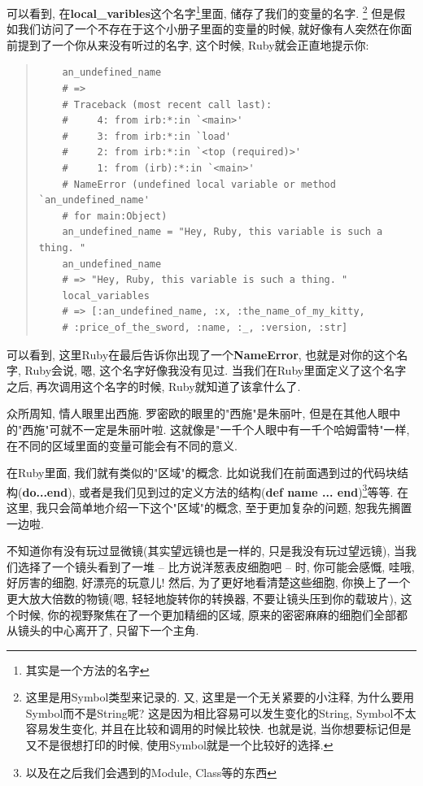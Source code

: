 可以看到, 在\textbf{local\_varibles}这个名字\footnote{其实是一个方法的名字}里面, 储存了我们的变量的名字. \footnote{这里是用Symbol类型来记录的. 又, 这里是一个无关紧要的小注释, 为什么要用Symbol而不是String呢? 这是因为相比容易可以发生变化的String, Symbol不太容易发生变化, 并且在比较和调用的时候比较快. 也就是说, 当你想要标记但是又不是很想打印的时候, 使用Symbol就是一个比较好的选择. } 但是假如我们访问了一个不存在于这个小册子里面的变量的时候, 就好像有人突然在你面前提到了一个你从来没有听过的名字, 这个时候, Ruby就会正直地提示你: 

\begin{quotation}
  \begin{verbatim}
    an_undefined_name
    # => 
    # Traceback (most recent call last):
    #     4: from irb:*:in `<main>'
    #     3: from irb:*:in `load'
    #     2: from irb:*:in `<top (required)>'
    #     1: from (irb):*:in `<main>'
    # NameError (undefined local variable or method `an_undefined_name' 
    # for main:Object)
    an_undefined_name = "Hey, Ruby, this variable is such a thing. "
    an_undefined_name
    # => "Hey, Ruby, this variable is such a thing. "
    local_variables
    # => [:an_undefined_name, :x, :the_name_of_my_kitty, 
    # :price_of_the_sword, :name, :_, :version, :str]
  \end{verbatim}
\end{quotation}

可以看到, 这里Ruby在最后告诉你出现了一个\textbf{NameError}, 也就是对你的这个名字, Ruby会说, 嗯, 这个名字好像我没有见过. 当我们在Ruby里面定义了这个名字之后, 再次调用这个名字的时候, Ruby就知道了该拿什么了. 

众所周知, 情人眼里出西施. 罗密欧的眼里的"西施"是朱丽叶, 但是在其他人眼中的"西施"可就不一定是朱丽叶啦. 这就像是"一千个人眼中有一千个哈姆雷特"一样, 在不同的区域里面的变量可能会有不同的意义. 

在Ruby里面, 我们就有类似的"区域"的概念. 比如说我们在前面遇到过的代码块结构(\textbf{do...end}), 或者是我们见到过的定义方法的结构(\textbf{def name ... end})\footnote{以及在之后我们会遇到的Module, Class等的东西}等等. 在这里, 我只会简单地介绍一下这个"区域"的概念, 至于更加复杂的问题, 恕我先搁置一边啦. 

不知道你有没有玩过显微镜(其实望远镜也是一样的, 只是我没有玩过望远镜), 当我们选择了一个镜头看到了一堆 -- 比方说洋葱表皮细胞吧 -- 时, 你可能会感慨, 哇哦, 好厉害的细胞, 好漂亮的玩意儿! 然后, 为了更好地看清楚这些细胞, 你换上了一个更大放大倍数的物镜(嗯, 轻轻地旋转你的转换器, 不要让镜头压到你的载玻片), 这个时候, 你的视野聚焦在了一个更加精细的区域, 原来的密密麻麻的细胞们全部都从镜头的中心离开了, 只留下一个主角. 

